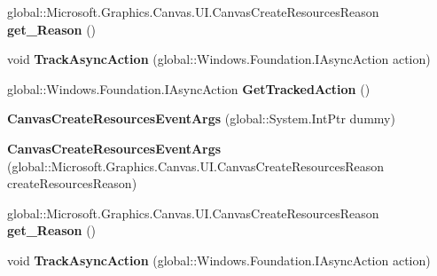 \begin{DoxyCompactItemize}
global\+::\+Microsoft.\+Graphics.\+Canvas.\+U\+I.\+Canvas\+Create\+Resources\+Reason {\bfseries get\+\_\+\+Reason} ()
\item 
\mbox{\label{class_microsoft_1_1_graphics_1_1_canvas_1_1_u_i_1_1_canvas_create_resources_event_args_af4082e3d50efdfe88607e77abbf80871}} 
void {\bfseries Track\+Async\+Action} (global\+::\+Windows.\+Foundation.\+I\+Async\+Action action)
\item 
\mbox{\label{class_microsoft_1_1_graphics_1_1_canvas_1_1_u_i_1_1_canvas_create_resources_event_args_adc12f96f4bcb8711da14472092a38891}} 
global\+::\+Windows.\+Foundation.\+I\+Async\+Action {\bfseries Get\+Tracked\+Action} ()
\item 
\mbox{\label{class_microsoft_1_1_graphics_1_1_canvas_1_1_u_i_1_1_canvas_create_resources_event_args_ae98b263ce96e012c6c79fb507af1887e}} 
{\bfseries Canvas\+Create\+Resources\+Event\+Args} (global\+::\+System.\+Int\+Ptr dummy)
\item 
\mbox{\label{class_microsoft_1_1_graphics_1_1_canvas_1_1_u_i_1_1_canvas_create_resources_event_args_a82b174b6991b45dae81601265385770c}} 
{\bfseries Canvas\+Create\+Resources\+Event\+Args} (global\+::\+Microsoft.\+Graphics.\+Canvas.\+U\+I.\+Canvas\+Create\+Resources\+Reason create\+Resources\+Reason)
\item 
\mbox{\label{class_microsoft_1_1_graphics_1_1_canvas_1_1_u_i_1_1_canvas_create_resources_event_args_ac34effc43e4224c4a19ddd6ff7883c3d}} 
global\+::\+Microsoft.\+Graphics.\+Canvas.\+U\+I.\+Canvas\+Create\+Resources\+Reason {\bfseries get\+\_\+\+Reason} ()
\item 
\mbox{\label{class_microsoft_1_1_graphics_1_1_canvas_1_1_u_i_1_1_canvas_create_resources_event_args_af4082e3d50efdfe88607e77abbf80871}} 
void {\bfseries Track\+Async\+Action} (global\+::\+Windows.\+Foundation.\+I\+Async\+Action action)

\end{DoxyCompactItemize}
